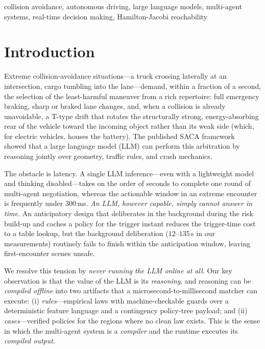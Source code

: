 \documentclass[conference]{IEEEtran}
\begin{document}
\begin{IEEEkeywords}
collision avoidance, autonomous driving, large language models, multi-agent
systems, real-time decision making, Hamilton-Jacobi reachability
\end{IEEEkeywords}

\section{Introduction}

Extreme collision-avoidance situations---a truck crossing laterally at an
intersection, cargo tumbling into the lane---demand, within a fraction of a
second, the selection of the least-harmful maneuver from a rich repertoire:
full emergency braking, sharp or braked lane changes, and, when a collision
is already unavoidable, a T-type drift that rotates the structurally strong,
energy-absorbing rear of the vehicle toward the incoming object rather than
its weak side (which, for electric vehicles, houses the battery). The
published SACA framework~\cite{saca} showed that a large language model (LLM)
can perform this arbitration by reasoning jointly over geometry, traffic
rules, and crash mechanics.

The obstacle is latency. A single LLM inference---even with a lightweight
model and thinking disabled---takes on the order of seconds to complete one
round of multi-agent negotiation, whereas the actionable window in an extreme
encounter is frequently under $300$\,ms. \emph{An LLM, however capable,
simply cannot answer in time.} An anticipatory design that deliberates in the
background during the risk build-up and caches a policy for the trigger
instant reduces the trigger-time cost to a table lookup, but the background
deliberation ($12$--$135$\,s in our measurements) routinely fails to finish
within the anticipation window, leaving first-encounter scenes unsafe.

We resolve this tension by \emph{never running the LLM online at all}. Our
key observation is that the value of the LLM is its \emph{reasoning}, and
reasoning can be \emph{compiled offline} into two artifacts that a
microsecond-to-millisecond matcher can execute: (i) \emph{rules}---empirical
laws with machine-checkable guards over a deterministic feature language and
a contingency policy-tree payload; and (ii) \emph{cases}---verified policies
for the regions where no clean law exists. This is the sense in which the
multi-agent system is a \emph{compiler} and the runtime executes its
\emph{compiled output}.
\end{document}
